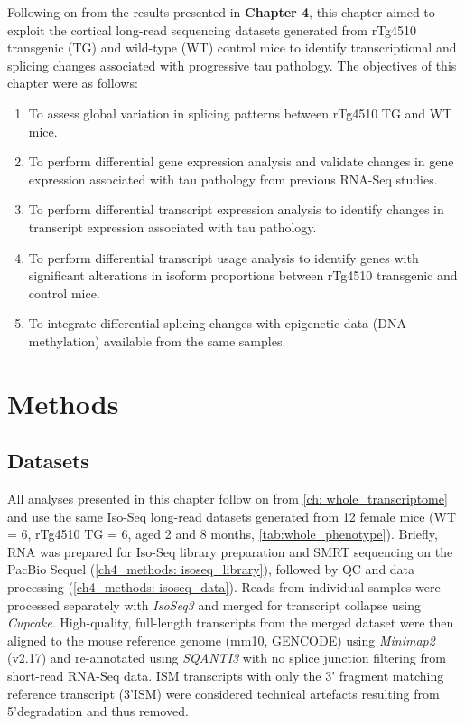 Following on from the results presented in \textbf{Chapter 4}, this chapter aimed to exploit the cortical long-read sequencing datasets generated from rTg4510 transgenic (TG) and wild-type (WT) control mice to identify transcriptional and splicing changes associated with progressive tau pathology. The objectives of this chapter were as follows: 
\begin{enumerate}
	\item To assess global variation in splicing patterns between rTg4510 TG and WT mice.
	\item To perform differential gene expression analysis and validate changes in gene expression associated with tau pathology from previous RNA-Seq studies. 
	\item To perform differential transcript expression analysis to identify changes in transcript expression associated with tau pathology.   
	\item To perform differential transcript usage analysis to identify genes with significant alterations in isoform proportions between rTg4510 transgenic and control mice. 
	\item To integrate differential splicing changes with epigenetic data (DNA methylation) available from the same samples.
\end{enumerate} 

\newpage
\section{Methods}

\subsection{Datasets}
All analyses presented in this chapter follow on from \cref{ch: whole_transcriptome} and use the same Iso-Seq long-read datasets generated from 12 female mice (WT = 6, rTg4510 TG = 6, aged 2 and 8 months, \cref{tab:whole_phenotype}). Briefly, RNA was prepared for Iso-Seq library preparation and SMRT sequencing on the PacBio Sequel (\cref{ch4_methods: isoseq_library}), followed by QC and data processing (\cref{ch4_methods: isoseq_data}). Reads from individual samples were processed separately with \textit{IsoSeq3} and merged for transcript collapse using \textit{Cupcake}. High-quality, full-length transcripts from the merged dataset were then aligned to the mouse reference genome (mm10, GENCODE) using \textit{Minimap2} (v2.17) and re-annotated using \textit{SQANTI3} with no splice junction filtering from short-read RNA-Seq data. ISM transcripts with only the 3' fragment matching reference transcript (3'ISM) were considered technical artefacts resulting from 5'degradation and thus removed.  

